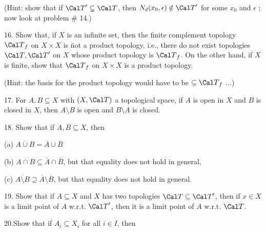 \ssk

\item{} (Hint: show that if ${\Cal T}^\prime\subsetneq {\Cal T}$, then $N_d(x_0,\epsilon)\notin{\Cal T}^\prime$
for some $x_0$ and $\epsilon$ ; now look at problem \# 14.)

\ssk

\item{16.} Show that, \u{if} $X$ is an infinite set, then the finite complement topology ${\Cal T}_f$ on 
$X\times X$ is \u{not} a product topology, i.e., there do not exist topologies 
${\Cal T},{\Cal T}^\prime$ on $X$ whose product topology is ${\Cal T}_f$. On the other hand, 
if $X$ is finite, show that ${\Cal T}_f$ on $X\times X$ \u{is} a product topology.

\ssk

\item{} (Hint: the \u{basis} for the product topology would have to be $\subseteq {\Cal T}_f$ ...)

\ssk
\item{17.} For $A,B\subseteq X$ with $(X,{\Cal T})$ a topological space, 
if $A$ is open in $X$ and $B$ is closed in $X$, 
then $A\setminus B$ is open and $B\setminus A$ is closed.

\ssk

\item{18.} Show that if $A,B\subseteq X$, then

\msk

(a) $\overline{A\cup B} = \overline{A}\cup\overline{B}$

\ssk

(b) $\overline{A\cap B} \subseteq \overline{A}\cap\overline{B}$, but that equality does not hold in general,

\ssk

(c) $\overline{A\setminus B} \supseteq \overline{A}\setminus\overline{B}$, but that equality does not hold in general.

\ssk

\item{19.} Show that if $A\subseteq X$ and $X$ has two topologies ${\Cal T}\subseteq {\Cal T}^\prime$, then 
if $x\in X$ is a limit point of $A$ w.r.t. ${\Cal T}^\prime$, then it is a limit point of $A$ w.r.t. ${\Cal T}$.

\ssk

\item{20.}Show that if $A_i\subseteq X_i$ for all $i\in I$, then

\msk


